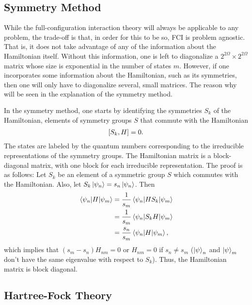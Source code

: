 \documentclass[Dual]{msu-thesis}
\begin{document}
\subsection{Symmetry Method} 
\label{symmetry_method_subsection}

While the full-configuration interaction theory will always be applicable to any problem, the trade-off is that, in order for this to be so, FCI is problem agnostic. That is, it does not take advantage of any of the information about the Hamiltonian itself. Without this information, one is left to diagonalize a $2^{2\Omega}\times 2^{2\Omega}$ matrix whose size is exponential in the number of states $m$. However, if one incorporates some information about the Hamiltonian, such as its symmetries, then one will only have to diagonalize several, small matrices. The reason why will be seen in the explanation of the symmetry method.

In the symmetry method, one starts by identifying the symmetries $S_k$ of the Hamiltonian, elements of symmetry groups $S$ that commute with the Hamiltonian
\begin{align}
\comm{S_k}{H}=0.
\end{align}
The states are labeled by the quantum numbers corresponding to the irreducible representations of the symmetry groups. The Hamiltonian matrix is a block-diagonal matrix, with one block for each irreducible representation. The proof is as follows: Let $S_k$ be an element of a symmetric group $S$ which commutes with the Hamiltonian. Also, let $S_k\ket{\psi_n}=s_n\ket{\psi_n}$. Then
\begin{align}
\mel{\psi_n}{H}{\psi_m}
&=
\frac{1}{s_m}\mel{\psi_n}{HS_k}{\psi_m}
\\
&=
\frac{1}{s_m}\mel{\psi_n}{S_kH}{\psi_m}
\\
&=\frac{s_n}{s_m}\mel{\psi_n}{H}{\psi_m},
\end{align}
which implies that $(s_m-s_n)H_{nm}=0$ or $H_{nm}=0$ if $s_n\neq s_m$ ($\ket{\psi}_n$ and $\ket{\psi}_m$ don't have the same eigenvalue with respect to $S_k$). Thus, the Hamiltonian matrix is block diagonal.

\subsection{Hartree-Fock Theory}
\label{subsection:hartree_fock_theory}
\end{document}
